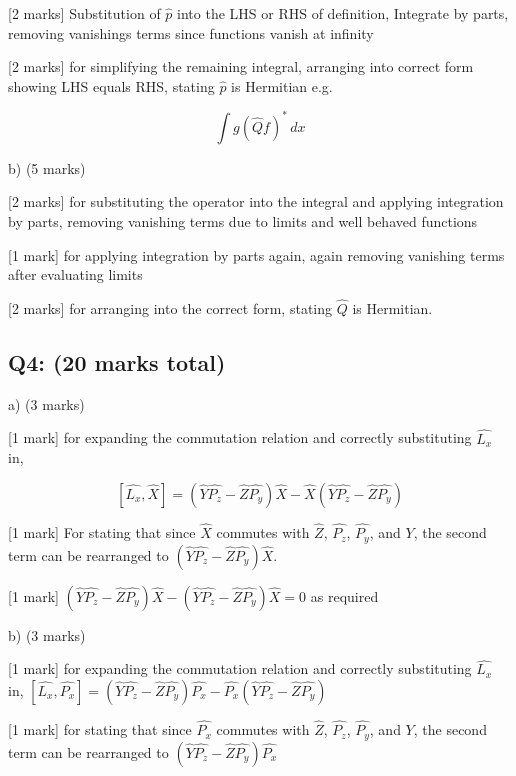 \documentclass[a4paper,11pt]{article}
\begin{document}
[2 marks] Substitution of \( \hat{p} \) into the LHS or RHS of definition, Integrate by parts, removing vanishings terms since functions vanish at infinity 

[2 marks] for simplifying the remaining integral, arranging into correct form showing LHS equals RHS, stating  \( \hat{p} \) is Hermitian e.g. 

\[ \int g (\hat{Q}f)^{*} \, dx \]

b) (5 marks)

[2 marks] for substituting the operator into the integral and applying integration by parts, removing vanishing terms due to limits and well behaved functions

[1 mark] for applying integration by parts again, again removing vanishing terms after evaluating limits

[2 marks] for arranging into the correct form, stating \(\hat{Q}\) is Hermitian. 

\subsection*{Q4: (20 marks total) }

a) (3 marks)

[1 mark] for expanding the commutation relation and correctly substituting \( \hat{L_{x}} \) in, 

\[ 
\left[ \hat{L_{x}}, \hat{X} \right] = (\hat{Y}\hat{P_{z}} - \hat{Z}\hat{P_{y}})\hat{X} - \hat{X}(\hat{Y}\hat{P_{z}} - \hat{Z}\hat{P_{y}})
\]

[1 mark] For stating that since \( \hat{X} \) commutes with \( \hat{Z} \), \( \hat{P_{z}} \), \( \hat{P_{y}} \), and \( Y \), the second term can be rearranged to \( (\hat{Y}\hat{P_{z}} - \hat{Z}\hat{P_{y}})\hat{X} \).

[1 mark] \( (\hat{Y}\hat{P_{z}} - \hat{Z}\hat{P_{y}})\hat{X} - (\hat{Y}\hat{P_{z}} - \hat{Z}\hat{P_{y}})\hat{X} = 0 \) as required

b) (3 marks)

[1 mark] for expanding the commutation relation and correctly substituting \( \hat{L_{x}} \) in, \([\hat{L_{x}}, \hat{P_{x}}] = (\hat{Y}\hat{P_{z}} - \hat{Z}\hat{P_{y}})\hat{P_{x}} - \hat{P_{x}}(\hat{Y}\hat{P_{z}} - \hat{Z}\hat{P_{y}})\)

[1 mark] for stating that since \( \hat{P_{x}} \) commutes with \( \hat{Z} \), \( \hat{P_{z}} \), \( \hat{P_{y}} \), and \( Y \), the second term can be rearranged to \( (\hat{Y}\hat{P_{z}} - \hat{Z}\hat{P_{y}})\hat{P_{x}} \)
\end{document}
